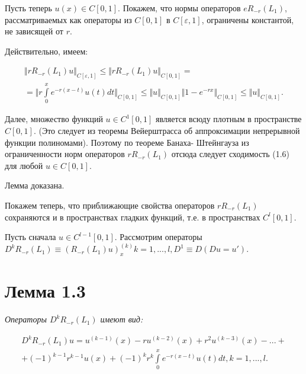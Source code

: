 Пусть теперь $ u(x) \in C[0,1] $. Покажем, что нормы операторов $ eR_{-r}(L_1) $, рассматриваемых как операторы из $  C[0,1] $ в $ C[\varepsilon,1] $, ограничены константой, не зависящей от $ r $.

Действительно, имеем:

\begin{equation}
\begin{array}{c}

\Vert rR_{-r}(L_1)u \Vert_{C[\varepsilon,1]} \leq \Vert rR_{-r}(L_1)u \Vert_{C[0,1]} = \\
= \bigl\Vert r\int\limits_0^x e^{-r(x-t)}u(t)dt\bigr\Vert_{C[0,1]} \leq \Vert u\Vert_{C[0,1]}\Vert 1 - e^{-rx}\Vert_{C[0,1]} \leq \Vert u \Vert_{C[0,1]}.

\end{array}
\end{equation}

Далее, множество функций $ u \in C^1[0,1] $ является всюду плотным в пространстве $ C[0,1] $. (Это следует из теоремы Вейерштрасса об аппроксимации непрерывной функции полиномами). Поэтому по теореме Банаха- Штейнгауза из ограниченности норм операторов $ rR_{-r}(L_1) $ отсюда следует сходимость (1.6) для любой $ u \in C[0,1] $.

Лемма доказана.

Покажем теперь, что приближающие свойства операторов $ rR_{-r}(L_1) $ сохраняются и в пространствах гладких функций, т.е. в пространствах $ C^l[0,1] $.

Пусть сначала $ u \in C^{l-1}[0,1] $. Рассмотрим операторы $ D^kR_{-r}(L_1) \equiv (R_{-r}(L_1)u)_x^{(k)} k = 1,...,l, D^1 \equiv D (Du = u')$.

\section{Лемма 1.3}
\label{lemma1.3}

\textit{Операторы $ D^kR_{-r}(L_1) $ имеют вид:}

\begin{equation}
\begin{array}{c}

D^kR_{-r}(L_1)u = u^{(k-1)}(x) - ru^{(k-2)}(x) + r^2u^{(k-3)}(x) - ... + \\
+ (-1)^{k-1}r^{k-1}u(x) + (-1)^kr^k\int\limits_0^x e^{-r(x-t)}u(t)dt, k = 1,...,l.

\end{array}
\end{equation}


